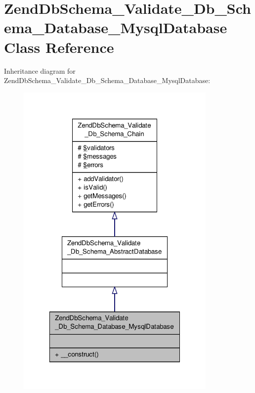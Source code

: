 \hypertarget{classZendDbSchema__Validate__Db__Schema__Database__MysqlDatabase}{\section{Zend\-Db\-Schema\-\_\-\-Validate\-\_\-\-Db\-\_\-\-Schema\-\_\-\-Database\-\_\-\-Mysql\-Database Class Reference}
\label{classZendDbSchema__Validate__Db__Schema__Database__MysqlDatabase}
}


Inheritance diagram for Zend\-Db\-Schema\-\_\-\-Validate\-\_\-\-Db\-\_\-\-Schema\-\_\-\-Database\-\_\-\-Mysql\-Database\-:\nopagebreak
\begin{figure}[H]
\begin{center}
\leavevmode
\includegraphics[width=276pt]{classZendDbSchema__Validate__Db__Schema__Database__MysqlDatabase__inherit__graph}
\end{center}
\end{figure}


